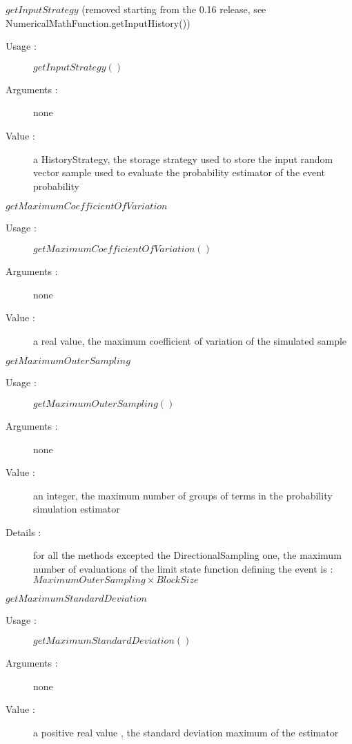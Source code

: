 \begin{description}
\begin{description}
  \item $getInputStrategy$ (removed starting from the 0.16 release, see NumericalMathFunction.getInputHistory())
    \begin{description}
    \item[Usage :] $getInputStrategy()$
    \item[Arguments :] none
    \item[Value :]  a HistoryStrategy, the storage strategy used to store the input random vector sample used to evaluate the probability estimator of the event probability
    \end{description}
    \bigskip

  \item $getMaximumCoefficientOfVariation$
    \begin{description}
    \item[Usage :] $getMaximumCoefficientOfVariation()$
    \item[Arguments :] none
    \item[Value :]  a real value, the maximum coefficient of variation of the simulated sample
    \end{description}
    \bigskip

  \item $getMaximumOuterSampling$
    \begin{description}
    \item[Usage :] $getMaximumOuterSampling()$
    \item[Arguments :] none
    \item[Value :]  an integer, the maximum number of groups of terms in the probability simulation estimator
    \item[Details :] for all the methods excepted the DirectionalSampling one, the maximum number of evaluations of the limit state function defining the event is : $MaximumOuterSampling\times BlockSize$
    \end{description}
    \bigskip

  \item $getMaximumStandardDeviation$
    \begin{description}
    \item[Usage :] $getMaximumStandardDeviation()$
    \item[Arguments :] none
    \item[Value :]  a positive real value , the standard deviation maximum of the estimator
    \end{description}
    \bigskip


\end{description}
\end{description}
